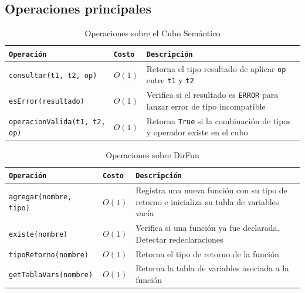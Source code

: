 \documentclass[12pt, letterpaper]{article}
\theoremstyle{definition}
\begin{document}
\subsection{Operaciones principales}
\begin{table}[H]
\centering
\caption{Operaciones sobre el Cubo Semántico}
\begin{tabular}{|p{4cm}|p{2cm}|p{5.5cm}|}
    \hline
    \texttt{Operación} & \texttt{Costo} & \texttt{Descripción} \\
    \hline
    \texttt{consultar(t1, t2, op)} & $O(1)$ &
    Retorna el tipo resultado de aplicar \texttt{op} entre \texttt{t1} y \texttt{t2} \\ \hline
    \texttt{esError(resultado)} & $O(1)$ &
    Verifica si el resultado es \texttt{ERROR} para lanzar
    error de tipo incompatible \\ \hline
    \texttt{operacionValida(t1, t2, op)} & $O(1)$ &
    Retorna \texttt{True} si la combinación de tipos y operador existe en el cubo \\ \hline
\end{tabular}
\end{table}

\begin{table}[H]
\centering
\caption{Operaciones sobre DirFun}
\begin{tabular}{|p{4cm}|p{2cm}|p{5.5cm}|}
    \hline
    \texttt{Operación} & \texttt{Costo} & \texttt{Descripción} \\
    \hline
    \texttt{agregar(nombre, tipo)} & $O(1)$ &
    Registra una nueva función con su tipo de retorno e inicializa su tabla de variables vacía \\ \hline
    \texttt{existe(nombre)} & $O(1)$ &
    Verifica si una función ya fue declarada. Detectar redeclaraciones \\ \hline
    \texttt{tipoRetorno(nombre)} & $O(1)$ &
    Retorna el tipo de retorno de la función \\ \hline
    \texttt{getTablaVars(nombre)} & $O(1)$ &
    Retorna la tabla de variables asociada a la función\\ \hline
\end{tabular}
\end{table}
\end{document}
